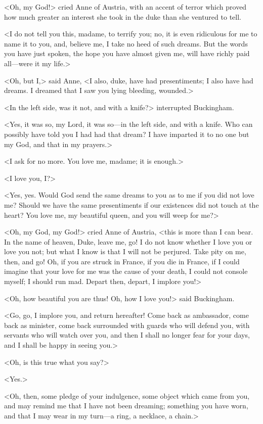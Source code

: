 <Oh, my God!> cried Anne of Austria, with an accent of terror which proved how much greater an interest she took in the duke than she ventured to tell. 

<I do not tell you this, madame, to terrify you; no, it is even ridiculous for me to name it to you, and, believe me, I take no heed of such dreams. But the words you have just spoken, the hope you have almost given me, will have richly paid all—were it my life.> 

<Oh, but I,> said Anne, <I also, duke, have had presentiments; I also have had dreams. I dreamed that I saw you lying bleeding, wounded.> 

<In the left side, was it not, and with a knife?> interrupted Buckingham. 

<Yes, it was so, my Lord, it was so—in the left side, and with a knife. Who can possibly have told you I had had that dream? I have imparted it to no one but my God, and that in my prayers.> 

<I ask for no more. You love me, madame; it is enough.> 

<I love you, I?> 

<Yes, yes. Would God send the same dreams to you as to me if you did not love me? Should we have the same presentiments if our existences did not touch at the heart? You love me, my beautiful queen, and you will weep for me?> 

<Oh, my God, my God!> cried Anne of Austria, <this is more than I can bear. In the name of heaven, Duke, leave me, go! I do not know whether I love you or love you not; but what I know is that I will not be perjured. Take pity on me, then, and go! Oh, if you are struck in France, if you die in France, if I could imagine that your love for me was the cause of your death, I could not console myself; I should run mad. Depart then, depart, I implore you!> 

<Oh, how beautiful you are thus! Oh, how I love you!> said Buckingham. 

<Go, go, I implore you, and return hereafter! Come back as ambassador, come back as minister, come back surrounded with guards who will defend you, with servants who will watch over you, and then I shall no longer fear for your days, and I shall be happy in seeing you.> 

<Oh, is this true what you say?> 

<Yes.> 

<Oh, then, some pledge of your indulgence, some object which came from you, and may remind me that I have not been dreaming; something you have worn, and that I may wear in my turn—a ring, a necklace, a chain.> 

